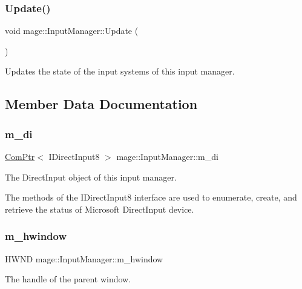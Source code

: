\subsubsection{\texorpdfstring{Update()}{Update()}}
{\footnotesize\ttfamily void mage\+::\+Input\+Manager\+::\+Update (\begin{DoxyParamCaption}{ }\end{DoxyParamCaption})}

Updates the state of the input systems of this input manager. 

\subsection{Member Data Documentation}
\hypertarget{classmage_1_1_input_manager_a0ffbd0e68b5bab33c35f310625884f3a}{}\label{classmage_1_1_input_manager_a0ffbd0e68b5bab33c35f310625884f3a} 
\subsubsection{\texorpdfstring{m\+\_\+di}{m\_di}}
{\footnotesize\ttfamily \hyperlink{namespacemage_ae74f374780900893caa5555d1031fd79}{Com\+Ptr}$<$ I\+Direct\+Input8 $>$ mage\+::\+Input\+Manager\+::m\+\_\+di\hspace{0.3cm}{\ttfamily [protected]}}

The Direct\+Input object of this input manager.

The methods of the I\+Direct\+Input8 interface are used to enumerate, create, and retrieve the status of Microsoft Direct\+Input device. \hypertarget{classmage_1_1_input_manager_a07a1d3a593bc497c747c6d2e4605a229}{}\label{classmage_1_1_input_manager_a07a1d3a593bc497c747c6d2e4605a229} 
\subsubsection{\texorpdfstring{m\+\_\+hwindow}{m\_hwindow}}
{\footnotesize\ttfamily H\+W\+ND mage\+::\+Input\+Manager\+::m\+\_\+hwindow\hspace{0.3cm}{\ttfamily [private]}}

The handle of the parent window. \hypertarget{classmage_1_1_input_manager_a196bdd04e169e89d0fa5f6a4a180e4cb}{}\label{classmage_1_1_input_manager_a196bdd04e169e89d0fa5f6a4a180e4cb} 
